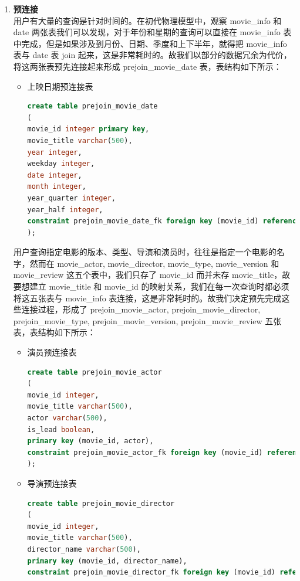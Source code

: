\documentclass{ctexrep}
\begin{document}
\begin{enumerate}
\begin{itemize}
        \end{itemize}
        \item \textbf{预连接}\\
        用户有大量的查询是针对时间的。在初代物理模型中，观察 movie\_info 和 date 两张表我们可以发现，对于年份和星期的查询可以直接在 movie\_info 表中完成，但是如果涉及到月份、日期、季度和上下半年，就得把 movie\_info 表与 date 表 join 起来，这是非常耗时的。故我们以部分的数据冗余为代价，将这两张表预先连接起来形成 prejoin\_movie\_date 表，表结构如下所示：
        \begin{itemize}
            \item 上映日期预连接表
                \begin{lstlisting}[language=sql]
create table prejoin_movie_date
(
movie_id integer primary key,
movie_title varchar(500),
year integer,
weekday integer,
date integer,
month integer,
year_quarter integer,
year_half integer,
constraint prejoin_movie_date_fk foreign key (movie_id) references movie_info_fact(movie_id)
);
                \end{lstlisting}
        \end{itemize}
        用户查询指定电影的版本、类型、导演和演员时，往往是指定一个电影的名字，然而在 movie\_actor, movie\_director, movie\_type, movie\_version 和 movie\_review 这五个表中，我们只存了 movie\_id 而并未存 movie\_title，故要想建立 movie\_title 和 movie\_id 的映射关系，我们在每一次查询时都必须将这五张表与 movie\_info 表连接，这是非常耗时的。故我们决定预先完成这些连接过程，形成了 prejoin\_movie\_actor, prejoin\_movie\_director, prejoin\_movie\_type, prejoin\_movie\_version, prejoin\_movie\_review 五张表，表结构如下所示：
        \begin{itemize}
            \item 演员预连接表
                \begin{lstlisting}[language=sql]
create table prejoin_movie_actor
(
movie_id integer,
movie_title varchar(500),
actor varchar(500),
is_lead boolean,
primary key (movie_id, actor),
constraint prejoin_movie_actor_fk foreign key (movie_id) references movie_info_fact(movie_id)
);
                \end{lstlisting}
            \item 导演预连接表
                \begin{lstlisting}[language=sql]
create table prejoin_movie_director
(
movie_id integer,
movie_title varchar(500),
director_name varchar(500),
primary key (movie_id, director_name),
constraint prejoin_movie_director_fk foreign key (movie_id) references movie_info_fact(movie_id)

\end{lstlisting}
\end{itemize}
\end{enumerate}
\end{document}
